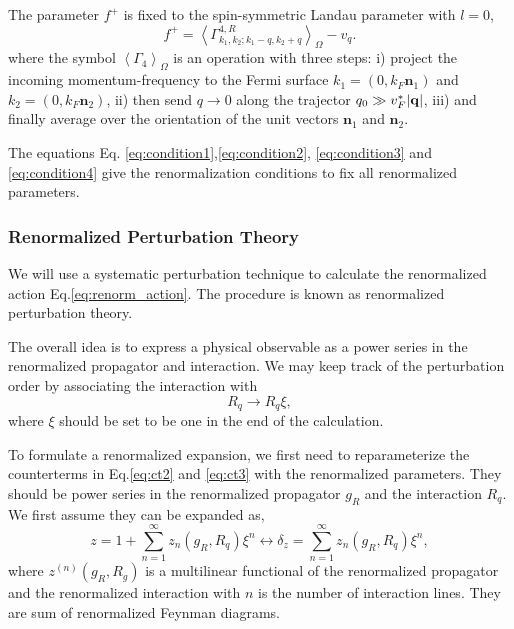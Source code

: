 \documentclass[reprint,amsmath,amssymb,aps,prb]{revtex4-1}
\begin{document}
The parameter $f^+$ is fixed to the spin-symmetric Landau parameter with $l=0$,
\begin{equation}
    \label{eq:condition4}
    f^+ = \left<\Gamma^{4,R}_{k_1, k_2; k_1-q, k_2+q}\right>_\Omega-v_q.
\end{equation}
where the symbol $\left<\Gamma_4\right>_\Omega$ is an operation with three steps:
i) project the incoming momentum-frequency to the Fermi surface $k_1=(0, k_F\mathbf{n}_1)$ and $k_2=(0, k_F\mathbf{n}_2)$,
ii) then send $q\rightarrow 0$ along the trajector $q_0 \gg v_F^*|\mathbf{q}|$,
iii) and finally average over the orientation of the unit vectors $\mathbf{n}_1$ and $\mathbf{n}_2$.

The equations Eq. \eqref{eq:condition1},\eqref{eq:condition2}, \eqref{eq:condition3} and \eqref{eq:condition4} give the renormalization conditions to fix all renormalized parameters.




\subsubsection{Renormalized Perturbation Theory}

We will use a systematic perturbation technique to calculate the renormalized action Eq.\eqref{eq:renorm_action}. The procedure is known as renormalized perturbation theory.

The overall idea is to express a physical observable as a power series in the renormalized propagator and interaction. We may keep track of the perturbation order by associating the interaction with
\begin{equation}
    R_q \rightarrow R_q\xi,
\end{equation}
where $\xi$ should be set to be one in the end of the calculation.

To formulate a renormalized expansion, we first need to reparameterize the counterterms in Eq.\eqref{eq:ct2} and \eqref{eq:ct3} with the renormalized parameters.
They should be power series in the renormalized propagator $g_R$ and the interaction $R_q$. We first assume they can be expanded as,
\begin{equation}
    z=1+\sum_{n=1}^\infty z_n(g_R, R_q)\xi^n \leftrightarrow \delta_z= \sum_{n=1}^\infty z_n(g_R, R_q)\xi^n,
\end{equation}
where $z^{(n)}(g_R, R_g)$ is a multilinear functional of the renormalized propagator and the renormalized interaction with $n$ is the number of interaction lines. They are sum of renormalized Feynman diagrams.
\end{document}
